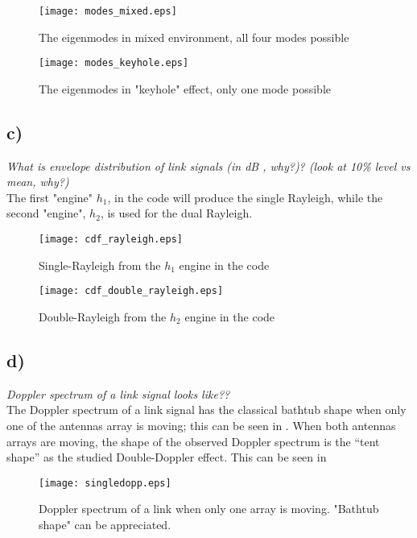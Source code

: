 \begin{figure}[!h]
  \centering
  \texttt{[image: modes\_mixed.eps]}
  \caption{The eigenmodes in mixed environment, all four modes possible}
  \label{fig:modes_mixed}
\end{figure}

\begin{figure}[!h]
  \centering
  \texttt{[image: modes\_keyhole.eps]}
  \caption{The eigenmodes in "keyhole" effect, only one mode possible}
  \label{fig:modes_mixed}
\end{figure}

\subsection{c)}
\textit{What is envelope distribution of link signals (in dB , why?)? (look at 10\% level vs mean, why?)}\\

The first "engine" $h_1$, in the code will produce the single Rayleigh, while the second "engine", $h_2$, is used for the dual Rayleigh.

\begin{figure}[!h]
  \centering
  \texttt{[image: cdf\_rayleigh.eps]}
  \caption{Single-Rayleigh from the $h_1$ engine in the code}
  \label{fig:modes_mixed}
\end{figure}

\begin{figure}[!h]
  \centering
  \texttt{[image: cdf\_double\_rayleigh.eps]}
  \caption{Double-Rayleigh from the $h_2$ engine in the code}
  \label{fig:modes_mixed}
\end{figure}

\subsection{d)}
\textit{Doppler spectrum of a link signal looks like??}\\

The Doppler spectrum of a link signal has the classical bathtub shape when only one of the antennas array is moving; this can be seen in . When both antennas arrays are moving, the shape of the observed Doppler spectrum is the ``tent shape'' as the studied Double-Doppler effect. This can be seen in 

\begin{figure}[!h]
  \centering
  \texttt{[image: singledopp.eps]}
  \caption{Doppler spectrum of a link when only one array is moving. "Bathtub shape" can be appreciated.}
  \label{fig:singledopp}
\end{figure}

